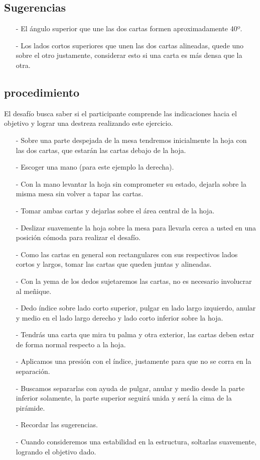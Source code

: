 \documentclass{article}
\begin{document}
\subsection{Sugerencias}
\begin{enumerate}
    \item [-]El ángulo superior que une las dos cartas formen aproximadamente 40º.
    \item[-]Los lados cortos superiores que unen las dos cartas alineadas, quede uno sobre el otro justamente, considerar esto si una carta es más densa que la otra.
\end{enumerate}
\subsection{procedimiento}
El desafío busca saber si el participante comprende las indicaciones hacia el objetivo y lograr una destreza realizando este ejercicio.
\begin{enumerate}
    \item [-]Sobre una parte despejada de la mesa tendremos inicialmente la hoja con las dos cartas, que estarán las cartas debajo de la hoja.
     \item [-]Escoger una mano (para este ejemplo la derecha).
     \item [-]Con la mano levantar la hoja sin comprometer su estado, dejarla sobre la misma mesa sin volver a tapar las cartas.
     \item [-]Tomar ambas cartas y dejarlas sobre el área central de la hoja.
     \item [-]Deslizar suavemente la hoja sobre la mesa para llevarla cerca a usted en una posición cómoda para realizar el desafío.  
     \item [-]Como las cartas en general son rectangulares con sus respectivos lados cortos y largos, tomar las cartas que queden juntas y alineadas.
     \item [-]Con la yema de los dedos sujetaremos las cartas, no es necesario involucrar al meñique.
     \item [-]Dedo índice sobre lado corto superior, pulgar en lado largo izquierdo, anular y medio en el lado largo derecho y lado corto inferior sobre la hoja.
     \item [-]Tendrás una carta que mira tu palma y otra exterior, las cartas deben estar de forma normal respecto a la hoja.
     \item [-]Aplicamos una presión con el índice, justamente para que no se corra en la separación.
     \item [-]Buscamos separarlas con ayuda de pulgar, anular y medio desde la parte inferior solamente, la parte superior seguirá unida y será la cima de la pirámide.
     \item [-]Recordar las sugerencias.
     \item [-]Cuando consideremos una estabilidad en la estructura, soltarlas suavemente, logrando el objetivo dado.

\end{enumerate}
\end{document}
